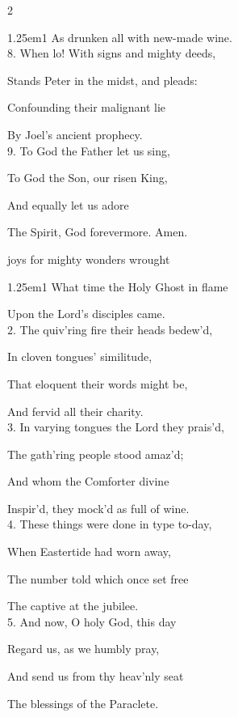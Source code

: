 \begin{paracol}{2}
\begin{hangparas}{1.25em}{1}
As drunken all with new-made wine.\\

8. When lo! With signs and mighty deeds,

Stands Peter in the midst, and pleads:

Confounding their malignant lie

By Joel's ancient prophecy.\\

9. To God the Father let us sing,

To God the Son, our risen King,

And equally let us adore

The Spirit, God forevermore. Amen.
\end{hangparas}

\switchcolumn

\mattinsOfficeHymn\label{WhitsundayMattinsHymn}
 joys for mighty wonders wrought

\begin{hangparas}{1.25em}{1}
What time the Holy Ghost in flame

Upon the Lord's disciples came.\\

2. The quiv'ring fire their heads bedew'd,

In cloven tongues' similitude,

That eloquent their words might be,

And fervid all their charity.\\

3. In varying tongues the Lord they prais'd,

The gath'ring people stood amaz'd;

And whom the Comforter divine

Inspir'd, they mock'd as full of wine.\\

4. These things were done in type to-day,

When Eastertide had worn away,

The number told which once set free

The captive at the jubilee.\\

5. And now, O holy God, this day

Regard us, as we humbly pray,

And send us from thy heav'nly seat

The blessings of the Paraclete.\\


\end{hangparas}
\end{paracol}
